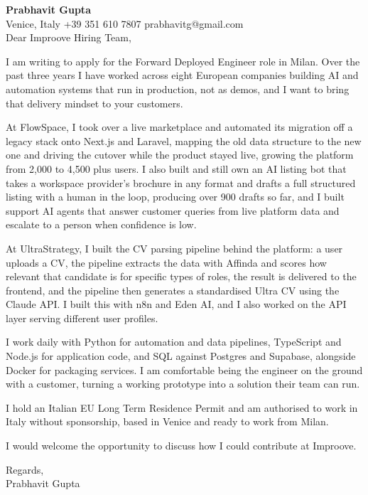 \documentclass[a4paper,10.5pt]{article}
\begin{document}
\textbf{Prabhavit Gupta}\\
Venice, Italy \textbar{} +39 351 610 7807 \textbar{} prabhavitg@gmail.com\\[10pt]
Dear Improove Hiring Team,

I am writing to apply for the Forward Deployed Engineer role in Milan. Over the past three years I have worked across eight European companies building AI and automation systems that run in production, not as demos, and I want to bring that delivery mindset to your customers.

At FlowSpace, I took over a live marketplace and automated its migration off a legacy stack onto Next.js and Laravel, mapping the old data structure to the new one and driving the cutover while the product stayed live, growing the platform from 2,000 to 4,500 plus users. I also built and still own an AI listing bot that takes a workspace provider's brochure in any format and drafts a full structured listing with a human in the loop, producing over 900 drafts so far, and I built support AI agents that answer customer queries from live platform data and escalate to a person when confidence is low.

At UltraStrategy, I built the CV parsing pipeline behind the platform: a user uploads a CV, the pipeline extracts the data with Affinda and scores how relevant that candidate is for specific types of roles, the result is delivered to the frontend, and the pipeline then generates a standardised Ultra CV using the Claude API. I built this with n8n and Eden AI, and I also worked on the API layer serving different user profiles.

I work daily with Python for automation and data pipelines, TypeScript and Node.js for application code, and SQL against Postgres and Supabase, alongside Docker for packaging services. I am comfortable being the engineer on the ground with a customer, turning a working prototype into a solution their team can run.

I hold an Italian EU Long Term Residence Permit and am authorised to work in Italy without sponsorship, based in Venice and ready to work from Milan.

I would welcome the opportunity to discuss how I could contribute at Improove.

Regards,\\
Prabhavit Gupta
\end{document}
